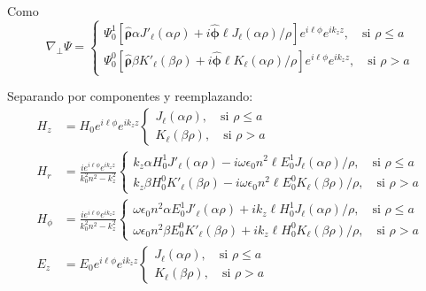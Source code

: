 Como 
\begin{equation*}
	\nabla_\perp \Psi =
	\left\{	
	\begin{matrix}
		\Psi_0^1\left[\boldsymbol{\hat{\rho}}\alpha J'_\ell (\alpha \rho) + i \boldsymbol{\hat{\phi}} \ell J_\ell (\alpha \rho)/\rho\right] e^{i\ell\phi} e^{i k_z z}, \quad \text{si } \rho \le a  
		\\
		\Psi_0^0\left[\boldsymbol{\hat{\rho}}\beta K'_\ell (\beta\rho) +i \boldsymbol{\hat{\phi}}\ell K_\ell (\alpha \rho)/\rho \right]e^{i\ell\phi} e^{i k_z z} , \quad \text{si } \rho > a  
	\end{matrix}
	\right.
\end{equation*}

Separando por componentes y reemplazando:
\begin{align*}
		H_z &= H_0 e^{i\ell\phi}e^{i k_z z}
	  	 \left\{
		\begin{matrix}	  	 
	  	 J_\ell (\alpha \rho), \quad \text{si } \rho \le a  
	  	 \\
	  	 K_\ell (\beta \rho), \quad \text{si } \rho > a  
	  	 \end{matrix}
	  	 \right.	
		\\
	  	 H_r &= \frac{i e^{i\ell\phi}e^{i k_z z} }{k_0^2 n^2 - k_z^2}
	  	 \left\{
		\begin{matrix}	  	 
	  	  k_z \alpha H_0^1 J'_\ell (\alpha \rho) - i\omega \epsilon_0 n^2\ell E_0^1 J_\ell (\alpha \rho)/\rho, \quad \text{si } \rho \le a  
	  	 \\
	  	 k_z \beta H_0^0  K'_\ell (\beta \rho) - i\omega \epsilon_0 n^2\ell E_0^0 K_\ell (\beta \rho)/\rho  , \quad \text{si } \rho > a  
	  	 \end{matrix}
	  	 \right.
	  	 \\
		H_\phi &= \frac{ie^{i\ell\phi} e^{i k_z z}}{k_0^2 n^2 - k_z^2}
		\left\{
		\begin{matrix}
			\omega \epsilon_0 n^2  \alpha E_0^1 J'_\ell (\alpha \rho)+ik_z\ell H_0^1  J_\ell (\alpha \rho)/\rho, \quad \text{si } \rho \le a  
			\\
			\omega \epsilon_0 n^2 \beta E_0^0  K'_\ell (\beta \rho)+ik_z \ell H_0^0  K_\ell (\beta \rho)/\rho , \quad \text{si } \rho > a  
		\end{matrix}
		\right.
		\\
		E_z &=  E_0 e^{i\ell\phi} e^{i k_z z}
	  	 \left\{
		\begin{matrix}	  	 
	  	J_\ell (\alpha \rho), \quad \text{si } \rho \le a  
	  	 \\
	  	 K_\ell (\beta \rho), \quad \text{si } \rho > a  

\end{matrix}
\end{align*}
